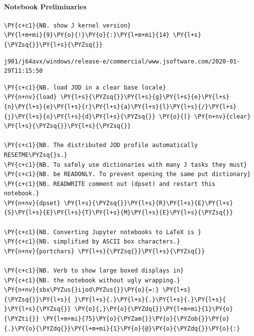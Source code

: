     \hypertarget{notebook-preliminaries}{%
\paragraph{Notebook Preliminaries}\label{notebook-preliminaries}}

    \begin{tcolorbox}[breakable, size=fbox, boxrule=1pt, pad at break*=1mm,colback=cellbackground, colframe=cellborder]
\begin{Verbatim}[commandchars=\\\{\}]
\PY{c+c1}{NB. show J kernel version}
\PY{l+m+mi}{9}\PY{o}{!}\PY{o}{:}\PY{l+m+mi}{14} \PY{l+s}{\PYZsq{}}\PY{l+s}{\PYZsq{}}
\end{Verbatim}
\end{tcolorbox}

    \begin{Verbatim}[commandchars=\\\{\}]
j901/j64avx/windows/release-e/commercial/www.jsoftware.com/2020-01-29T11:15:50
    \end{Verbatim}

    \begin{tcolorbox}[breakable, size=fbox, boxrule=1pt, pad at break*=1mm,colback=cellbackground, colframe=cellborder]
\begin{Verbatim}[commandchars=\\\{\}]
\PY{c+c1}{NB. load JOD in a clear base locale}
\PY{n+nv}{load} \PY{l+s}{\PYZsq{}}\PY{l+s}{g}\PY{l+s}{e}\PY{l+s}{n}\PY{l+s}{e}\PY{l+s}{r}\PY{l+s}{a}\PY{l+s}{l}\PY{l+s}{/}\PY{l+s}{j}\PY{l+s}{o}\PY{l+s}{d}\PY{l+s}{\PYZsq{}} \PY{o}{[} \PY{n+nv}{clear} \PY{l+s}{\PYZsq{}}\PY{l+s}{\PYZsq{}}

\PY{c+c1}{NB. The distributed JOD profile automatically RESETME\PYZsq{}s.}
\PY{c+c1}{NB. To safely use dictionaries with many J tasks they must}
\PY{c+c1}{NB. be READONLY. To prevent opening the same put dictionary}
\PY{c+c1}{NB. READWRITE comment out (dpset) and restart this notebook.}
\PY{n+nv}{dpset} \PY{l+s}{\PYZsq{}}\PY{l+s}{R}\PY{l+s}{E}\PY{l+s}{S}\PY{l+s}{E}\PY{l+s}{T}\PY{l+s}{M}\PY{l+s}{E}\PY{l+s}{\PYZsq{}}

\PY{c+c1}{NB. Converting Jupyter notebooks to LaTeX is }
\PY{c+c1}{NB. simplified by ASCII box characters.}
\PY{n+nv}{portchars} \PY{l+s}{\PYZsq{}}\PY{l+s}{\PYZsq{}}

\PY{c+c1}{NB. Verb to show large boxed displays in}
\PY{c+c1}{NB. the notebook without ugly wrapping.}
\PY{n+nv}{sbx\PYZus{}ijod\PYZus{}}\PY{o}{=:} \PY{l+s}{\PYZsq{}}\PY{l+s}{ }\PY{l+s}{.}\PY{l+s}{.}\PY{l+s}{.}\PY{l+s}{ }\PY{l+s}{\PYZsq{}} \PY{o}{,}\PY{o}{\PYZdq{}}\PY{l+m+mi}{1}\PY{o}{\PYZti{}} \PY{l+m+mi}{75}\PY{o}{\PYZam{}}\PY{o}{\PYZob{}}\PY{o}{.}\PY{o}{\PYZdq{}}\PY{l+m+mi}{1}\PY{o}{@}\PY{o}{\PYZdq{}}\PY{o}{:}
\end{Verbatim}
\end{tcolorbox}

